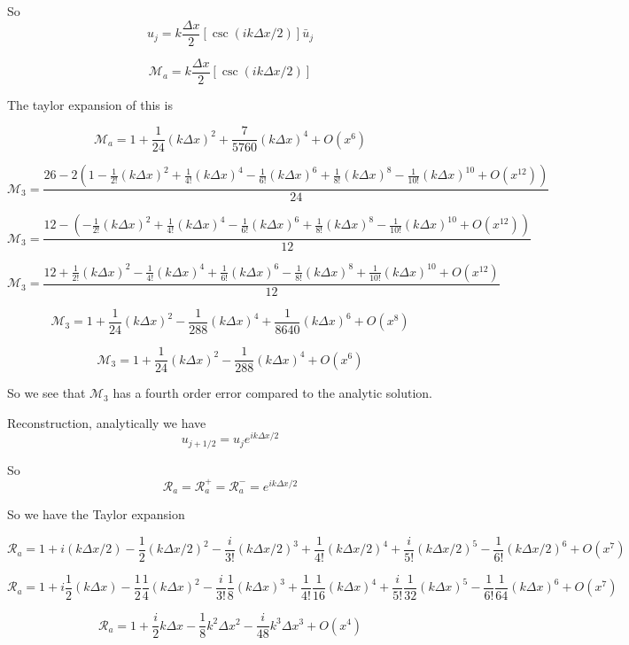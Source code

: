 \documentclass[12pt]{article}
\begin{document}
So 
\[u_j =  k\frac{\Delta x}{2} \left[\csc\left(ik \Delta x/ 2\right)\right] \bar{u}_j\]

\[\mathcal{M}_a = k\frac{\Delta x}{2} \left[\csc\left(ik \Delta x/ 2\right)\right] \]

The taylor expansion of this is

\[\mathcal{M}_a = 1 + \frac{1}{24} (k\Delta x)^2 + \frac{7}{5760} (k\Delta x)^4 + O(x^{6}) \]

\[\mathcal{M}_3= \frac{26  -2\left(1 - \frac{1}{2!} (k\Delta x)^2 + \frac{1}{4!} (k\Delta x)^4 - \frac{1}{6!} (k\Delta x)^6 + \frac{1}{8!} (k\Delta x)^8 - \frac{1}{10!} (k\Delta x)^{10} + O(x^{12})\right)}{24}\]

\[\mathcal{M}_3= \frac{12 -\left(- \frac{1}{2!} (k\Delta x)^2 + \frac{1}{4!} (k\Delta x)^4 - \frac{1}{6!} (k\Delta x)^6 + \frac{1}{8!} (k\Delta x)^8 - \frac{1}{10!} (k\Delta x)^{10} + O(x^{12})\right)}{12}\]

\[\mathcal{M}_3= \frac{12  + \frac{1}{2!} (k\Delta x)^2 - \frac{1}{4!} (k\Delta x)^4 + \frac{1}{6!} (k\Delta x)^6 - \frac{1}{8!} (k\Delta x)^8 + \frac{1}{10!} (k\Delta x)^{10} + O(x^{12})}{12}\]

\[\mathcal{M}_3= 1 + \frac{1}{24} (k\Delta x)^2 - \frac{1}{288} (k\Delta x)^4 + \frac{1}{8640} (k\Delta x)^6 + O(x^{8})\]

\[\mathcal{M}_3= 1 + \frac{1}{24} (k\Delta x)^2 - \frac{1}{288} (k\Delta x)^4 + O(x^{6})\]


So we see that $\mathcal{M}_3$ has a fourth order error compared to the analytic solution. 

Reconstruction, analytically we have
\[u_{j + 1/2} = u_j e^{ik\Delta x/2}\]

So
\[\mathcal{R}_a = \mathcal{R}^+_a = \mathcal{R}^-_a =e^{ik\Delta x/2} \]

So we have the Taylor expansion

\[\mathcal{R}_a = 1 + i (k\Delta x/2)  - \frac{1}{2} (k\Delta x/2)^2 - \frac{i}{3!} (k\Delta x/2)^3 + \frac{1}{4!} (k\Delta x/2)^4 + \frac{i}{5!} (k\Delta x/2)^5 - \frac{1}{6!} (k\Delta x/2)^6 + O(x^{7})\]

\[\mathcal{R}_a = 1 + i \frac{1}{2}(k\Delta x)  - \frac{1}{2}\frac{1}{4} (k\Delta x)^2 - \frac{i}{3!} \frac{1}{8}(k\Delta x)^3 + \frac{1}{4!} \frac{1}{16} (k\Delta x)^4 + \frac{i}{5!} \frac{1}{32} (k\Delta x)^5 - \frac{1}{6!}\frac{1}{64} (k\Delta x)^6 + O(x^{7})\]

\[\mathcal{R}_a = 1 + \frac{i}{2}k\Delta x   - \frac{1}{8}k^2\Delta x^2 - \frac{i}{48}k^3\Delta x^3 + O(x^{4})\]
\end{document}
